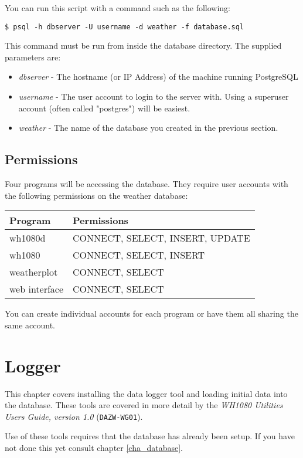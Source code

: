 \documentclass[a4paper,10pt,draft]{book}
\begin{document}
You can run this script with a command such as the following:
\begin{verbatim}
$ psql -h dbserver -U username -d weather -f database.sql 
\end{verbatim}
This command must be run from inside the database directory. The supplied parameters are:
\begin{itemize}
\item \emph{dbserver} - The hostname (or IP Address) of the machine running PostgreSQL
\item \emph{username} - The user account to login to the server with. Using a superuser account (often called "postgres") will be easiest.
\item \emph{weather} - The name of the database you created in the previous section.
\end{itemize}

\section{Permissions}
Four programs will be accessing the database. They require user accounts with the following permissions on the weather database:

\begin{tabular}{l l}
\hline
\textbf{Program} & \textbf{Permissions} \\
\hline
wh1080d & CONNECT, SELECT, INSERT, UPDATE \\
wh1080 & CONNECT, SELECT, INSERT \\
weatherplot & CONNECT, SELECT \\
web interface & CONNECT, SELECT \\
\hline
\end{tabular}

You can create individual accounts for each program or have them all sharing the same account.


\chapter{Logger}

This chapter covers installing the data logger tool and loading initial data into the database. These tools are covered in more detail by the \emph{WH1080 Utilities Users Guide, version 1.0} (\verb|DAZW-WG01|).

Use of these tools requires that the database has already been setup. If you have not done this yet consult chapter \ref{cha_database}.
\end{document}
